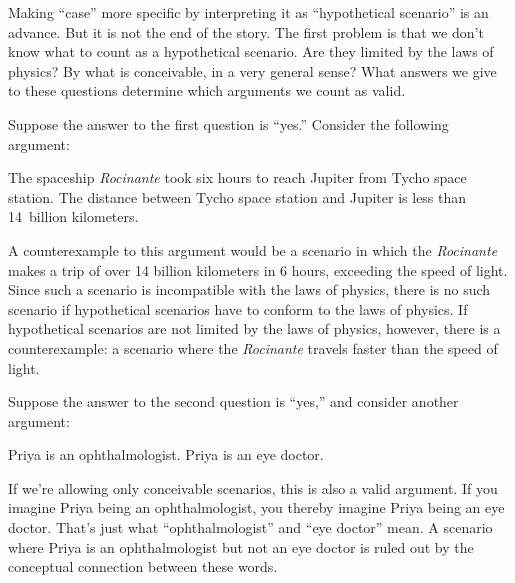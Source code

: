 Making ``case'' more specific by interpreting it as ``hypothetical scenario'' is an advance. But it is not the end of the story.  The first problem is that we don't know what to count as a hypothetical scenario. Are they limited by the laws of physics? By what is conceivable, in a very general sense?  What answers we give to these questions determine which arguments we count as valid.

Suppose the answer to the first question is ``yes.'' Consider the following argument:
	\begin{earg}
		\prem The spaceship \emph{Rocinante} took six hours to reach Jupiter from Tycho space station.
		\conc The distance between Tycho space station and Jupiter is less than 14~billion kilometers.
	\end{earg}
A counterexample to this argument would be a scenario in which the \emph{Rocinante} makes a trip of over 14 billion kilometers in 6 hours, exceeding the speed of light. Since such a scenario is incompatible with the laws of physics, there is no such scenario if hypothetical scenarios have to conform to the laws of physics.  If hypothetical scenarios are not limited by the laws of physics, however, there is a counterexample: a scenario where the \emph{Rocinante} travels faster than the speed of light. 

Suppose the answer to the second question is ``yes,'' and consider another argument:
	\begin{earg}
		\prem Priya is an ophthalmologist.
		\conc Priya is an eye doctor.
	\end{earg}
If we're allowing only conceivable scenarios, this is also a valid argument. If you imagine Priya being an ophthalmologist, you thereby imagine Priya being an eye doctor. That's just what ``ophthalmologist'' and ``eye doctor'' mean.  A scenario where Priya is an ophthalmologist but not an eye doctor is ruled out by the conceptual connection between these words.

